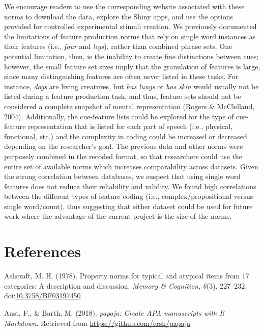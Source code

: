 \documentclass[english,,man]{apa6}
\begin{document}
We encourage readers to use the corresponding website associated with these norms to download the data, explore the Shiny apps, and use the options provided for controlled experimental stimuli creation. We previously documented the limitations of feature production norms that rely on single word instances as their features (i.e., \emph{four} and \emph{legs}), rather than combined phrase sets. One potential limitation, then, is the inability to create fine distinctions between cues; however, the small feature set sizes imply that the granulation of features is large, since many distinguishing features are often never listed in these tasks. For instance, \emph{dogs} are living creatures, but \emph{has lungs} or \emph{has skin} would usually not be listed during a feature production task, and thus, feature sets should not be considered a complete snapshot of mental representation (Rogers \& McClelland, 2004). Additionally, the cue-feature lists could be explored for the type of cue-feature representation that is listed for each part of speech (i.e., physical, functional, etc.) and the complexity in coding could be increased or decreased depending on the researcher's goal. The previous data and other norms were purposely combined in the recoded format, so that researchers could use the entire set of available norms which increases comparability across datasets. Given the strong correlation between databases, we suspect that using single word features does not reduce their reliability and validity. We found high correlations between the different types of feature coding (i.e., complex/propositional versus single word/count), thus suggesting that either dataset could be used for future work where the advantage of the current project is the size of the norms.

\newpage

\hypertarget{references}{%
\section{References}\label{references}}

\setlength{\parindent}{-0.5in}
\setlength{\leftskip}{0.5in}

\hypertarget{refs}{}
\leavevmode\hypertarget{ref-Ashcraft1978a}{}%
Ashcraft, M. H. (1978). Property norms for typical and atypical items from 17 categories: A description and discussion. \emph{Memory \& Cognition}, \emph{6}(3), 227--232. doi:\href{https://doi.org/10.3758/BF03197450}{10.3758/BF03197450}

\leavevmode\hypertarget{ref-R-papaja}{}%
Aust, F., \& Barth, M. (2018). \emph{papaja: Create APA manuscripts with R Markdown}. Retrieved from \url{https://github.com/crsh/papaja}
\end{document}
